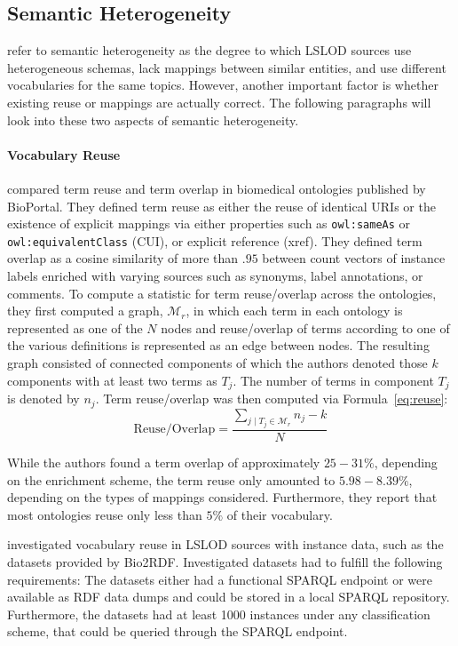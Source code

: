 \documentclass[runningheads]{llncs}
\begin{document}
    \subsection{Semantic Heterogeneity}
    \citet{kamdar2021empirical} refer to semantic heterogeneity as the degree to which LSLOD sources use heterogeneous schemas, lack mappings between similar entities, and use different vocabularies for the same topics.
    However, another important factor is whether existing reuse or mappings are actually correct.
    The following paragraphs will look into these two aspects of semantic heterogeneity.

    \paragraph{Vocabulary Reuse}
    \citet{kamdar2017systematic} compared term reuse and term overlap in biomedical ontologies published by BioPortal.
    They defined term reuse as either the reuse of identical URIs or the existence of explicit mappings via either properties such as \texttt{owl:sameAs} or \texttt{owl:equivalentClass} (CUI), or explicit reference (xref).
    They defined term overlap as a cosine similarity of more than $.95$ between count vectors of instance labels enriched with varying sources such as synonyms, label annotations, or comments.
    To compute a statistic for term reuse/overlap across the ontologies, they first computed a graph, $\mathscr{M}_{r}$, in which each term in each ontology is represented as one of the $N$ nodes and reuse/overlap of terms according to one of the various definitions is represented as an edge between nodes.
    The resulting graph consisted of connected components of which the authors denoted those $k$ components with at least two terms as $T_j$.
    The number of terms in component $T_j$ is denoted by $n_j$.
    Term reuse/overlap was then computed via Formula~\ref{eq:reuse}:
    \begin{equation}\label{eq:reuse}
        \text{Reuse/Overlap}=\frac{\sum_{j \mid T_{j} \in \mathscr{M}_{r}} n_{j}-k}{N}
    \end{equation}

    While the authors found a term overlap of approximately $25 - 31\%$, depending on the enrichment scheme, the term reuse only amounted to $5.98 - 8.39\%$, depending on the types of mappings considered.
    Furthermore, they report that most ontologies reuse only less than $5\%$ of their vocabulary.

    \citet{kamdar2021empirical} investigated vocabulary reuse in LSLOD sources with instance data, such as the datasets provided by Bio2RDF\@.
    Investigated datasets had to fulfill the following requirements:
    The datasets either had a functional SPARQL endpoint or were available as RDF data dumps and could be stored in a local SPARQL repository.
    Furthermore, the datasets had at least 1000 instances under any classification scheme, that could be queried through the SPARQL endpoint.
\end{document}
